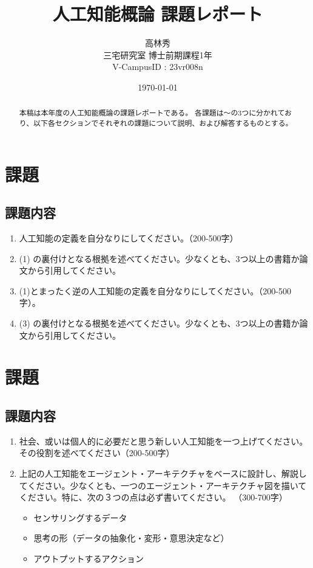 \documentclass{article}[jsarticle]
\title{人工知能概論 課題レポート}
\author{高林秀 \\ 三宅研究室 博士前期課程1年 \\ V-CampusID : 23vr008n}
\date{\today}
\begin{document}
\maketitle

\begin{abstract}
    本稿は本年度の人工知能概論の課題レポートである。
    各課題は～の3つに分かれており、以下各セクションでそれぞれの課題について説明、および解答するものとする。
\end{abstract}

\section{課題}
\subsection{課題内容}
\begin{enumerate}
    \item 人工知能の定義を自分なりにしてください。（200-500字）
    \item (1) の裏付けとなる根拠を述べてください。少なくとも、3つ以上の書籍か論文から引用してください。
    \item(1)とまったく逆の人工知能の定義を自分なりにしてください。（200-500字）。
    \item (3) の裏付けとなる根拠を述べてください。少なくとも、3つ以上の書籍か論文から引用してください。
\end{enumerate}

\section{課題}
\subsection{課題内容}
\begin{enumerate}
    \item 社会、或いは個人的に必要だと思う新しい人工知能を一つ上げてください。その役割を述べてください（200-500字）
    \item 上記の人工知能をエージェント・アーキテクチャをベースに設計し、解説してください。少なくとも、一つのエージェント・アーキテクチャ図を描いてください。特に、次の３つの点は必ず書いてください。
    （300-700字）
    \begin{itemize}
        \item センサリングするデータ
        \item 思考の形（データの抽象化・変形・意思決定など）
        \item アウトプットするアクション
    \end{itemize}
\end{enumerate}
    
\end{document}
